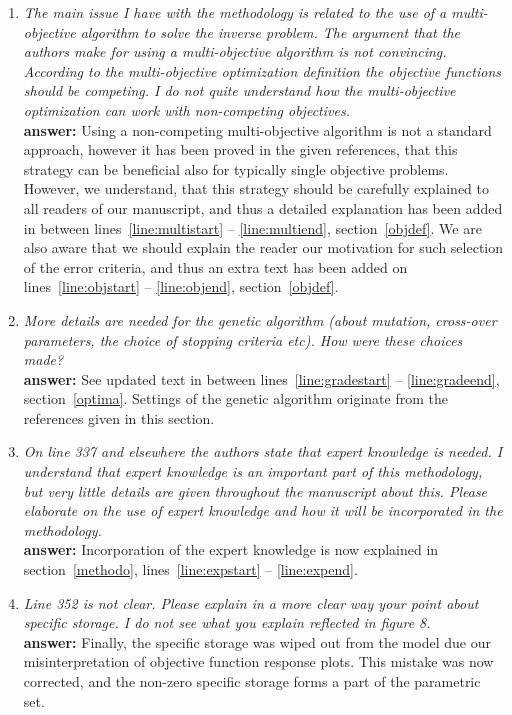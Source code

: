 \documentclass[final,3p, 11pt, a4paper]{elsarticle}
\begin{document}
\begin{enumerate}
\item {\it  The main issue I have with the methodology is related to the use of a multi-objective algorithm to solve the inverse problem. The argument that the authors make for using a multi-objective algorithm is not convincing. According to the multi-objective optimization definition the objective functions should be competing. I do not quite understand how the multi-objective optimization can work with non-competing objectives.} \\ 
{\bf  answer:} Using a non-competing multi-objective algorithm is not a standard approach, however it has been proved in the given references, that this strategy can be beneficial also for typically single objective problems. However, we understand, that this strategy should be carefully explained to all readers of our manuscript, and thus a detailed explanation has been added in between lines~\ref{line:multistart} -- \ref{line:multiend}, section~\ref{objdef}. We are also aware that we should explain the reader our motivation for such selection of the error criteria, and thus an extra text has been added on lines~\ref{line:objstart} -- \ref{line:objend}, section~\ref{objdef}.

\item {\it   More details are needed for the genetic algorithm (about mutation, cross-over parameters, the choice of stopping criteria etc). How were these choices made?} \\
{\bf  answer:} See updated text in between lines~\ref{line:gradestart} -- \ref{line:gradeend}, section~\ref{optima}. Settings of the genetic algorithm originate from the references given in this section.

\item {\it On line 337 and elsewhere the authors state that expert knowledge is needed.  I understand that expert knowledge is an important part of this methodology, but very little details are given throughout the manuscript about this. Please elaborate on the use of expert knowledge and how it will be incorporated in the methodology.} \\
{\bf  answer:} Incorporation of the expert knowledge is now explained in section~\ref{methodo}, lines~\ref{line:expstart} -- \ref{line:expend}.

\item {\it  Line 352 is not clear. Please explain in a more clear way your point about specific storage. I do not see what you explain reflected in figure 8.} \\ 
{\bf  answer:} Finally, the specific storage was wiped out from the model due our misinterpretation of objective function response plots. This mistake was now corrected, and the non-zero specific storage forms a part of the parametric set.

\end{enumerate}
\end{document}
